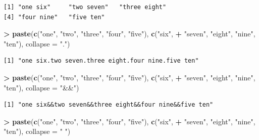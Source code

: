 \documentclass[]{krantz}
\makeatletter
\newenvironment{Shaded}{\begin{snugshade}}{\end{snugshade}}
\newcommand{\DataTypeTok}[1]{\textcolor[rgb]{0.27,0.27,0.27}{#1}}
\newcommand{\KeywordTok}[1]{\textcolor[rgb]{0.27,0.27,0.27}{\textbf{#1}}}
\newcommand{\NormalTok}[1]{#1}
\newcommand{\OperatorTok}[1]{\textcolor[rgb]{0.43,0.43,0.43}{\textbf{#1}}}
\newcommand{\StringTok}[1]{\textcolor[rgb]{0.5,0.5,0.5}{#1}}
\newenvironment{kframe}{%
\medskip{}
\setlength{\fboxsep}{.8em}
 \def\at@end@of@kframe{}%
 \ifinner\ifhmode%
  \def\at@end@of@kframe{\end{minipage}}%
  \begin{minipage}{\columnwidth}%
 \fi\fi%
 \def\FrameCommand##1{\hskip\@totalleftmargin \hskip-\fboxsep
 \colorbox{shadecolor}{##1}\hskip-\fboxsep
     \hskip-\linewidth \hskip-\@totalleftmargin \hskip\columnwidth}%
 \MakeFramed {\advance\hsize-\width
   \@totalleftmargin\z@ \linewidth\hsize
   \@setminipage}}%
 {\par\unskip\endMakeFramed%
 \at@end@of@kframe}
\renewenvironment{Shaded}{\begin{kframe}}{\end{kframe}}
\makeatother
\begin{document}
\begin{verbatim}
[1] "one six"     "two seven"   "three eight"
[4] "four nine"   "five ten"   
\end{verbatim}

\begin{Shaded}
\begin{Highlighting}[]
\OperatorTok{>}\StringTok{ }\KeywordTok{paste}\NormalTok{(}\KeywordTok{c}\NormalTok{(}\StringTok{"one"}\NormalTok{, }\StringTok{"two"}\NormalTok{, }\StringTok{"three"}\NormalTok{, }\StringTok{"four"}\NormalTok{, }\StringTok{"five"}\NormalTok{), }\KeywordTok{c}\NormalTok{(}\StringTok{"six"}\NormalTok{, }
\OperatorTok{+}\StringTok{   "seven"}\NormalTok{, }\StringTok{"eight"}\NormalTok{, }\StringTok{"nine"}\NormalTok{, }\StringTok{"ten"}\NormalTok{), }\DataTypeTok{collapse =} \StringTok{"."}\NormalTok{)}
\end{Highlighting}
\end{Shaded}

\begin{verbatim}
[1] "one six.two seven.three eight.four nine.five ten"
\end{verbatim}

\begin{Shaded}
\begin{Highlighting}[]
\OperatorTok{>}\StringTok{ }\KeywordTok{paste}\NormalTok{(}\KeywordTok{c}\NormalTok{(}\StringTok{"one"}\NormalTok{, }\StringTok{"two"}\NormalTok{, }\StringTok{"three"}\NormalTok{, }\StringTok{"four"}\NormalTok{, }\StringTok{"five"}\NormalTok{), }\KeywordTok{c}\NormalTok{(}\StringTok{"six"}\NormalTok{, }
\OperatorTok{+}\StringTok{   "seven"}\NormalTok{, }\StringTok{"eight"}\NormalTok{, }\StringTok{"nine"}\NormalTok{, }\StringTok{"ten"}\NormalTok{), }\DataTypeTok{collapse =} \StringTok{"&&"}\NormalTok{)}
\end{Highlighting}
\end{Shaded}

\begin{verbatim}
[1] "one six&&two seven&&three eight&&four nine&&five ten"
\end{verbatim}

\begin{Shaded}
\begin{Highlighting}[]
\OperatorTok{>}\StringTok{ }\KeywordTok{paste}\NormalTok{(}\KeywordTok{c}\NormalTok{(}\StringTok{"one"}\NormalTok{, }\StringTok{"two"}\NormalTok{, }\StringTok{"three"}\NormalTok{, }\StringTok{"four"}\NormalTok{, }\StringTok{"five"}\NormalTok{), }\KeywordTok{c}\NormalTok{(}\StringTok{"six"}\NormalTok{, }
\OperatorTok{+}\StringTok{   "seven"}\NormalTok{, }\StringTok{"eight"}\NormalTok{, }\StringTok{"nine"}\NormalTok{, }\StringTok{"ten"}\NormalTok{), }\DataTypeTok{collapse =} \StringTok{" "}\NormalTok{)}
\end{Highlighting}
\end{Shaded}
\end{document}
